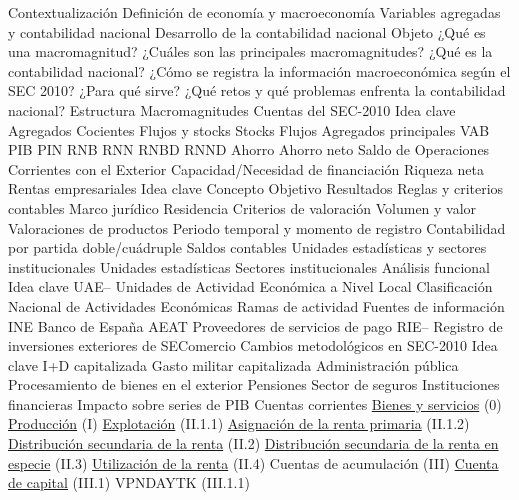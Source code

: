 \documentclass{nuevotema}
\begin{document}
\begin{esquema}[enumerate]
	\1[] 
		\2 Contextualización
			\3 Definición de economía y macroeconomía
			\3 Variables agregadas y contabilidad nacional
			\3 Desarrollo de la contabilidad nacional
		\2 Objeto
			\3 ¿Qué es una macromagnitud?
			\3 ¿Cuáles son las principales macromagnitudes?
			\3 ¿Qué es la contabilidad nacional?
			\3 ¿Cómo se registra la información macroeconómica según el SEC 2010?
			\3 ¿Para qué sirve?
			\3 ¿Qué retos y qué problemas enfrenta la contabilidad nacional?
		\2 Estructura
			\3 Macromagnitudes
			\3 Cuentas del SEC-2010
	\1 
		\2 Idea clave
			\3 Agregados
			\3 Cocientes
		\2 Flujos y stocks
			\3 Stocks
			\3 Flujos
		\2 Agregados principales
			\3 VAB
			\3 PIB
			\3 PIN
			\3 RNB
			\3 RNN
			\3 RNBD
			\3 RNND
			\3 Ahorro
			\3 Ahorro neto
			\3 Saldo de Operaciones Corrientes con el Exterior
			\3 Capacidad/Necesidad de financiación
			\3 Riqueza neta
			\3 Rentas empresariales
	\1 
		\2 Idea clave
			\3 Concepto
			\3 Objetivo
			\3 Resultados
		\2 Reglas y criterios contables
			\3 Marco jurídico
			\3 Residencia
			\3 Criterios de valoración
			\3 Volumen y valor
			\3 Valoraciones de productos
			\3 Periodo temporal y momento de registro
			\3 Contabilidad por partida doble/cuádruple
			\3 Saldos contables
		\2 Unidades estadísticas y sectores institucionales
			\3 Unidades estadísticas
			\3 Sectores institucionales
		\2 Análisis funcional
			\3 Idea clave
			\3 UAE-- Unidades de Actividad Económica a Nivel Local
			\3 Clasificación Nacional de Actividades Económicas
			\3 Ramas de actividad
		\2 Fuentes de información
			\3 INE
			\3 Banco de España
			\3 AEAT
			\3 Proveedores de servicios de pago
			\3 RIE-- Registro de inversiones exteriores de SEComercio
		\2 Cambios metodológicos en SEC-2010
			\3 Idea clave
			\3 I+D capitalizada
			\3 Gasto militar capitalizada
			\3 Administración pública
			\3 Procesamiento de bienes en el exterior
			\3 Pensiones
			\3 Sector de seguros
			\3 Instituciones financieras
			\3 Impacto sobre series de PIB
		\2 Cuentas corrientes
			\3 \underline{Bienes y servicios} (0)
			\3 \underline{Producción} (I)
			\3 \underline{Explotación} (II.1.1)
			\3 \underline{Asignación de la renta primaria} (II.1.2)
			\3 \underline{Distribución secundaria de la renta} (II.2)
			\3 \underline{Distribución secundaria de la renta en especie} (II.3)
			\3 \underline{Utilización de la renta} (II.4)
		\2 Cuentas de acumulación (III)
			\3 \underline{Cuenta de capital} (III.1)
			\3 VPNDAYTK (III.1.1) 

\end{esquema}
\end{document}
